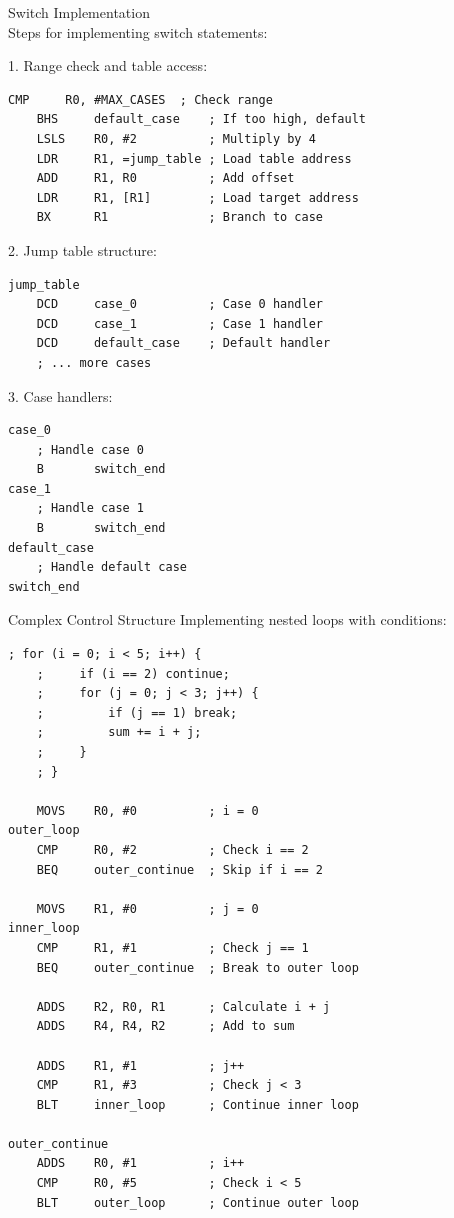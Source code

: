 \begin{KR}{Switch Implementation}\\
Steps for implementing switch statements:

1. Range check and table access:
\begin{lstlisting}[language=armasm, style=base]
    CMP     R0, #MAX_CASES  ; Check range
    BHS     default_case    ; If too high, default
    LSLS    R0, #2          ; Multiply by 4
    LDR     R1, =jump_table ; Load table address
    ADD     R1, R0          ; Add offset
    LDR     R1, [R1]        ; Load target address
    BX      R1              ; Branch to case
\end{lstlisting}

2. Jump table structure:
\begin{lstlisting}[language=armasm, style=base]
jump_table
    DCD     case_0          ; Case 0 handler
    DCD     case_1          ; Case 1 handler
    DCD     default_case    ; Default handler
    ; ... more cases
\end{lstlisting}

3. Case handlers:
\begin{lstlisting}[language=armasm, style=base]
case_0
    ; Handle case 0
    B       switch_end
case_1
    ; Handle case 1
    B       switch_end
default_case
    ; Handle default case
switch_end
\end{lstlisting}
\end{KR}

\begin{example2}{Complex Control Structure}
Implementing nested loops with conditions:
\begin{lstlisting}[language=armasm, style=base]
    ; for (i = 0; i < 5; i++) {
    ;     if (i == 2) continue;
    ;     for (j = 0; j < 3; j++) {
    ;         if (j == 1) break;
    ;         sum += i + j;
    ;     }
    ; }
    
    MOVS    R0, #0          ; i = 0
outer_loop
    CMP     R0, #2          ; Check i == 2
    BEQ     outer_continue  ; Skip if i == 2
    
    MOVS    R1, #0          ; j = 0
inner_loop
    CMP     R1, #1          ; Check j == 1
    BEQ     outer_continue  ; Break to outer loop
    
    ADDS    R2, R0, R1      ; Calculate i + j
    ADDS    R4, R4, R2      ; Add to sum
    
    ADDS    R1, #1          ; j++
    CMP     R1, #3          ; Check j < 3
    BLT     inner_loop      ; Continue inner loop
    
outer_continue
    ADDS    R0, #1          ; i++
    CMP     R0, #5          ; Check i < 5
    BLT     outer_loop      ; Continue outer loop
\end{lstlisting}
\end{example2}